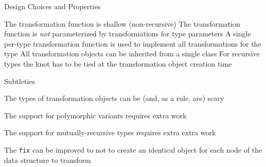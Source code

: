 \documentclass{beamer}
\theoremstyle{definition}
\theoremstyle{plain} %
\begin{document}
\begin{frame}[fragile]{Design Choices and Properties}

  The transformation function is shallow (non-recursive)
  \vskip5mm
  The transformation function is \emph{not} parameterized by transformations for type parameters
  \vskip5mm
  A single per-type transformation function is used to implement all transformations for the type
  \vskip5mm
  All transformation objects can be inherited from a single class
  \vskip5mm
  For recursive types the knot has to be tied at the transformation object creation time
  
\end{frame}


\begin{comment}
  We swept a number of subtleties under the carpet:

  1. The types of transformation classes/objects can be verbose and scary; it is rather easy to get type parameters
  wrong, especially for the first few times; the right skill comes later. However, as long as only predefined
  transformations are used, an end-user never touches the object level.

  2. The described scheme has to be elaborated further to work with polymorphic variants.

  3. The support for extensibility in mutually-recursive case is even more complicated (but doable, and done). 

  4. A naive implementation of \lstinline|fix| creates a transformation object per recursive call; this can be avoided.  
\end{comment}

\begin{frame}[fragile]{Subtleties}
  
  The types of transformation objects can be (and, as a rule, are) scary 
  \vskip5mm

  The support for polymorphic variants requires extra work
  \vskip5mm

  The support for mutually-recursive types requires extra extra work
  \vskip5mm

  The \lstinline[basicstyle=\large]|fix| can be improved to not to create an identical object for each
  node of the data structure to transform
\end{frame}

\end{document}
